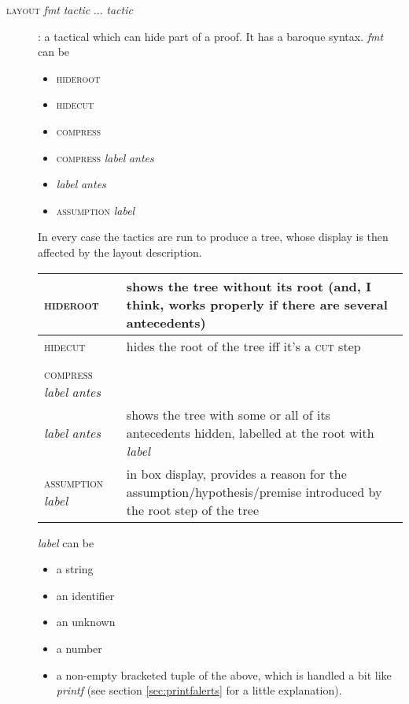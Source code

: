 \begin{description}
\item [\textsc{layout} \textit{fmt} \textit{tactic} ... \textit{tactic}]: a tactical which can hide part of a proof. It has a baroque syntax. \textit{fmt} can be 
\begin{itemize}
\item \textsc{hideroot}
\item \textsc{hidecut} 
\item \textsc{compress}
\item \textsc{compress} \textit{label} \textit{antes}
\item \textit{label} \textit{antes}
\item \textsc{assumption} \textit{label}
\end{itemize}
In every case the tactics are run to produce a tree, whose display is then affected by the layout description. 
\hspace{10pt}\begin{longtable}{|l|p{280pt}|} \hline
\textsc{hideroot} & 
{\raggedright shows the tree without its root (and, I think, works properly if there are several antecedents)} \\ \hline
\textsc{hidecut} &
{\raggedright hides the root of the tree iff it's a \textsc{cut} step} \\ \hline
\hspace{-6pt}\begin{tabular}{l}
\textsc{compress} \\
\textsc{compress} \textit{label} \textit{antes} \\
\textit{label} \textit{antes}
\end{tabular}
 &
 {\raggedright shows the tree with some or all of its antecedents hidden, labelled at the root with \textit{label}} \\ \hline
\textsc{assumption} \textit{label} & 
{\raggedright in box display, provides a reason for the assumption/hypothesis/premise introduced by the root step of the tree} \\ \hline
\end{longtable}

\textit{label} can be \begin{itemize}
\item a string
\item an identifier
\item an unknown
\item a number 
\item a non-empty bracketed tuple of the above, which is handled a bit like \textit{printf} (see section \ref{sec:printfalerts} for a little explanation).
\end{itemize}


\end{description}
